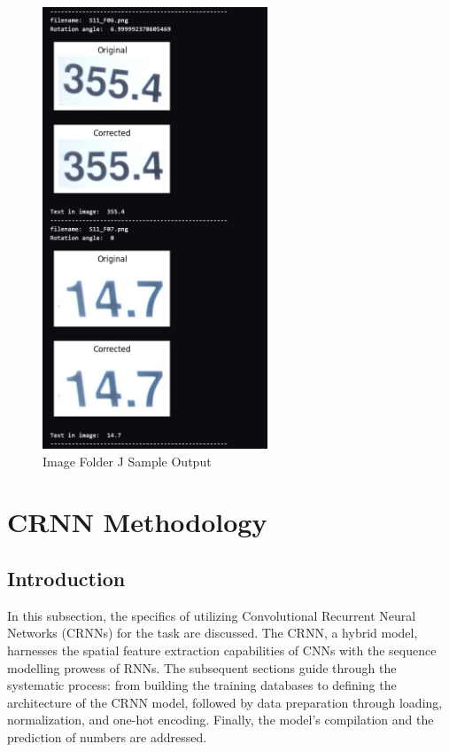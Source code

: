 \begin{figure}[ht]
    \centering
    \includegraphics[width=0.6\textwidth]{Figures/Methodology/sipa_11/sample_output.jpg}
    \caption[Image Folder J Sample Output]{Image Folder J Sample Output}
    \label{fig:Image Folder J Sample Output}
\end{figure}




\newpage

\section{CRNN Methodology}

\subsection{Introduction}

In this subsection, the specifics of utilizing Convolutional Recurrent Neural Networks (CRNNs) for the task are discussed. The CRNN, a hybrid model, harnesses the spatial feature extraction capabilities of CNNs with the sequence modelling prowess of RNNs. The subsequent sections guide through the systematic process: from building the training databases to defining the architecture of the CRNN model, followed by data preparation through loading, normalization, and one-hot encoding. Finally, the model's compilation and the prediction of numbers are addressed.


